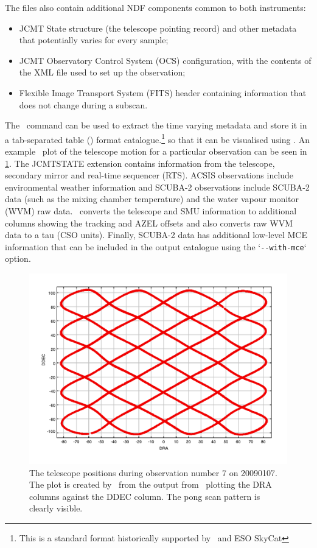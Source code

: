 \documentclass[oneside,11pt]{starlink}
\begin{document}
The files also contain additional NDF components common to both
instruments:
\begin{itemize}
\item JCMT State structure (the telescope pointing record) and other
  metadata that potentially varies for every sample;
\item JCMT Observatory Control System (OCS) configuration, with the
  contents of the XML file used to set up the observation;
\item Flexible Image Transport System (FITS) header containing
  information that does not change during a subscan.
\end{itemize}

The \jcmtstate\ command can be used to extract the time varying
metadata and store it in a tab-separated table
() format catalogue.\footnote{This is a
  standard format historically supported by \CURSA\ and ESO SkyCat} so
that it can be visualised using \topcat. An example \topcat\ plot of the
telescope motion for a particular observation can be seen in
\ref{fig:topcat}. The JCMTSTATE extension contains information from
the telescope, secondary mirror and real-time sequencer (RTS). ACSIS
observations include environmental weather information and SCUBA-2
observations include SCUBA-2 data (such as the mixing chamber
temperature) and the water vapour monitor (WVM) raw data. \jcmtstate\
converts the telescope and SMU information to additional columns
showing the tracking and AZEL offsets and also converts raw WVM data
to a tau (CSO units). Finally, SCUBA-2 data has additional low-level
MCE information that can be included in the output catalogue using the
`\verb+--with-mce+` option.

\begin{figure}
\begin{center}
\includegraphics[width=1\textwidth]{sun258_scan_pattern}
\caption{The telescope positions during observation number 7 on
  20090107. The plot is created by \topcat\ from the output from
\jcmtstate\ plotting the DRA columns against the DDEC column. The pong
scan pattern is clearly visible.}
\label{fig:topcat}
\end{center}
\end{figure}
\end{document}
